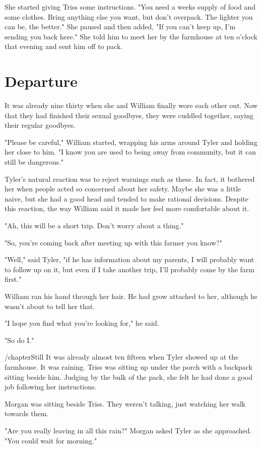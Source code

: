 \documentclass[courier]{sffms}
\begin{document}
She started giving Triss some instructions. "You need
a weeks supply of food and some clothes. Bring anything
else you want, but don't overpack. The lighter you
can be, the better." She paused and then added, "If
you can't keep up, I'm sending you back here." She 
told him to meet her by the farmhouse at ten o'clock
that evening and sent him off to pack.

\chapter{Departure}
It was already nine thirty when she and William finally
wore each other out. Now that they had finished their
sexual goodbyes, they were cuddled together,
saying their regular goodbyes.

"Please be careful," William started, wrapping
his arms around Tyler and holding her close
to him. "I know you are used to being away
from community, but it can still be dangerous."

Tyler's natural reaction was to reject warnings
such as these. In fact, it bothered her when
people acted so concerned about her safety.
Maybe she was a little naive, but she had a 
good head and tended to make rational
decisions. Despite this reaction, the way
William said it made her feel more comfortable
about it.

"Ah, this will be a short trip. Don't worry about
a thing."

"So, you're coming back after meeting up with
this farmer you know?"

"Well," said Tyler, "if he has information about
my parents, I will probably want to follow up
on it, but even if I take another trip, I'll
probably come by the farm first."

William ran his hand through her hair. He
had grow attached to her, although he wasn't
about to tell her that.

 "I hope you find what you're looking for," he
said.

"So do I."

/chapter{Still}
It was already almost ten fifteen when Tyler
showed up at the farmhouse. It was raining.
Triss was sitting up under the porch with a
backpack sitting beside him. Judging by the
bulk of the pack, she felt he had done a good
job following her instructions.

Morgan was sitting beside Triss. They weren't
talking, just watching her walk towards them.

"Are you really leaving in all this rain?" Morgan
asked Tyler as she approached. "You could wait
for morning."
\end{document}
